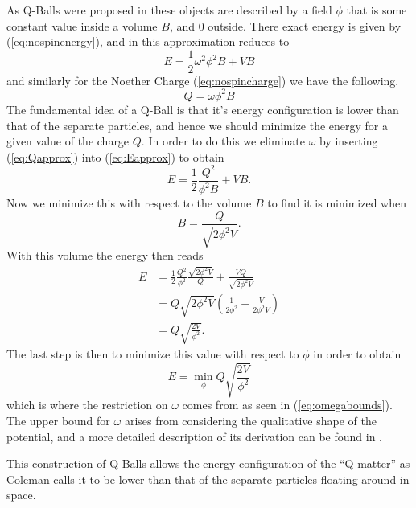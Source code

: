 As Q-Balls were proposed in \cite{coleman} these objects are described by a field $\phi$ that is some constant value inside a volume $B$, and 0 outside. There exact energy is given by (\ref{eq:nospinenergy}), and in this approximation reduces to
\begin{equation}\label{eq:Eapprox}
E = \frac{1}{2}\omega^2\phi^2B + VB
\end{equation}
and similarly for the Noether Charge (\ref{eq:nospincharge}) we have the following.
\begin{equation}\label{eq:Qapprox}
Q = \omega \phi^2 B
\end{equation}
The fundamental idea of a Q-Ball is that it's energy configuration is lower than that of the separate particles, and hence we should minimize the energy for a given value of the charge $Q$. In order to do this we eliminate $\omega$ by inserting (\ref{eq:Qapprox}) into (\ref{eq:Eapprox}) to obtain
\begin{equation}
E = \frac{1}{2}\frac{Q^2}{\phi^2 B} + VB.
\end{equation}
Now we minimize this with respect to the volume $B$ to find it is minimized when
\begin{equation}
B = \frac{Q}{\sqrt{2\phi^2 V}}.
\end{equation}
With this volume the energy then reads
\begin{align}
E & = \frac{1}{2}\frac{Q^2}{\phi^2}\frac{\sqrt{2\phi^2 V}}{Q} + \frac{VQ}{\sqrt{2\phi^2 V}} \\
 & = Q\sqrt{2\phi^2 V}\left( \frac{1}{2\phi^2} + \frac{V}{2\phi^2 V}\right) \\
 & = Q \sqrt{\frac{2V}{\phi^2}}.
\end{align}
The last step is then to minimize this value with respect to $\phi$ in order to obtain
\begin{equation}
E = \min_\phi Q \sqrt{\frac{2V}{\phi^2}}
\end{equation}
which is where the restriction on $\omega$ comes from as seen in (\ref{eq:omegabounds}). The upper bound for $\omega$ arises from considering the qualitative shape of the potential, and a more detailed description of its derivation can be found in \cite{coleman, qball6}.

This construction of Q-Balls allows the energy configuration of the ``Q-matter'' as Coleman calls it to be lower than that of the separate particles floating around in space.